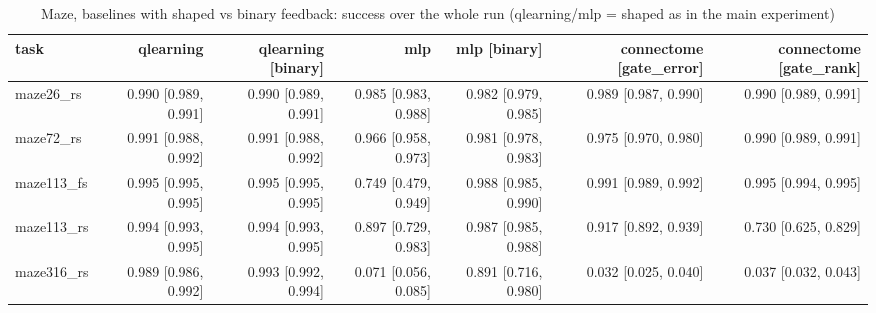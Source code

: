 \begin{table}[t]
\centering
\small
\begin{tabular}{lrrrrrr}
\toprule
task & qlearning & qlearning [binary] & mlp & mlp [binary] & connectome [gate\_error] & connectome [gate\_rank] \\
\midrule
maze26\_rs & 0.990 [0.989, 0.991] & 0.990 [0.989, 0.991] & 0.985 [0.983, 0.988] & 0.982 [0.979, 0.985] & 0.989 [0.987, 0.990] & 0.990 [0.989, 0.991] \\
maze72\_rs & 0.991 [0.988, 0.992] & 0.991 [0.988, 0.992] & 0.966 [0.958, 0.973] & 0.981 [0.978, 0.983] & 0.975 [0.970, 0.980] & 0.990 [0.989, 0.991] \\
maze113\_fs & 0.995 [0.995, 0.995] & 0.995 [0.995, 0.995] & 0.749 [0.479, 0.949] & 0.988 [0.985, 0.990] & 0.991 [0.989, 0.992] & 0.995 [0.994, 0.995] \\
maze113\_rs & 0.994 [0.993, 0.995] & 0.994 [0.993, 0.995] & 0.897 [0.729, 0.983] & 0.987 [0.985, 0.988] & 0.917 [0.892, 0.939] & 0.730 [0.625, 0.829] \\
maze316\_rs & 0.989 [0.986, 0.992] & 0.993 [0.992, 0.994] & 0.071 [0.056, 0.085] & 0.891 [0.716, 0.980] & 0.032 [0.025, 0.040] & 0.037 [0.032, 0.043] \\
\bottomrule
\end{tabular}
\caption{Maze, baselines with shaped vs binary feedback: success over the whole run (qlearning/mlp = shaped as in the main experiment)}
\label{tab:gridworld_binary_overall_success}
\end{table}